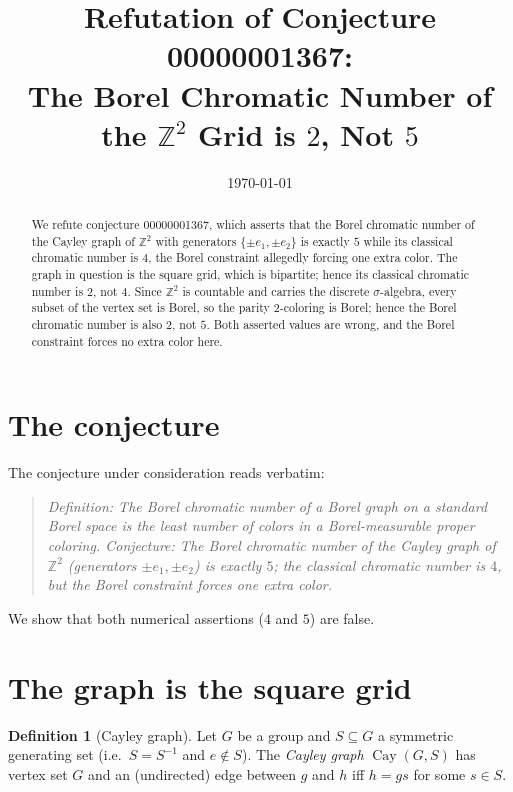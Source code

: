 \documentclass[11pt]{article}
\title{Refutation of Conjecture 00000001367:\\[2pt]
The Borel Chromatic Number of the $\mathbb{Z}^2$ Grid is $2$, Not $5$}
\author{}
\date{\today}
\theoremstyle{definition}
\newtheorem{definition}[theorem]{Definition}
\begin{document}
\maketitle

\begin{abstract}
We refute conjecture 00000001367, which asserts that the Borel chromatic number
of the Cayley graph of $\mathbb{Z}^2$ with generators $\{\pm e_1,\pm e_2\}$ is
exactly $5$ while its classical chromatic number is $4$, the Borel constraint
allegedly forcing one extra color. The graph in question is the square grid,
which is bipartite; hence its classical chromatic number is $2$, not $4$. Since
$\mathbb{Z}^2$ is countable and carries the discrete $\sigma$-algebra, every
subset of the vertex set is Borel, so the parity $2$-coloring is Borel; hence
the Borel chromatic number is also $2$, not $5$. Both asserted values are wrong,
and the Borel constraint forces no extra color here.
\end{abstract}

\section{The conjecture}

The conjecture under consideration reads verbatim:

\begin{quote}
\emph{Definition: The Borel chromatic number of a Borel graph on a standard Borel
space is the least number of colors in a Borel-measurable proper coloring.
Conjecture: The Borel chromatic number of the Cayley graph of $\mathbb{Z}^2$
(generators $\pm e_1,\pm e_2$) is exactly $5$; the classical chromatic number is
$4$, but the Borel constraint forces one extra color.}
\end{quote}

We show that both numerical assertions ($4$ and $5$) are false.

\section{The graph is the square grid}

\begin{definition}[Cayley graph]
Let $G$ be a group and $S\subseteq G$ a symmetric generating set (i.e.\
$S=S^{-1}$ and $e\notin S$). The \emph{Cayley graph} $\operatorname{Cay}(G,S)$
has vertex set $G$ and an (undirected) edge between $g$ and $h$ iff
$h=gs$ for some $s\in S$.
\end{definition}
\end{document}
